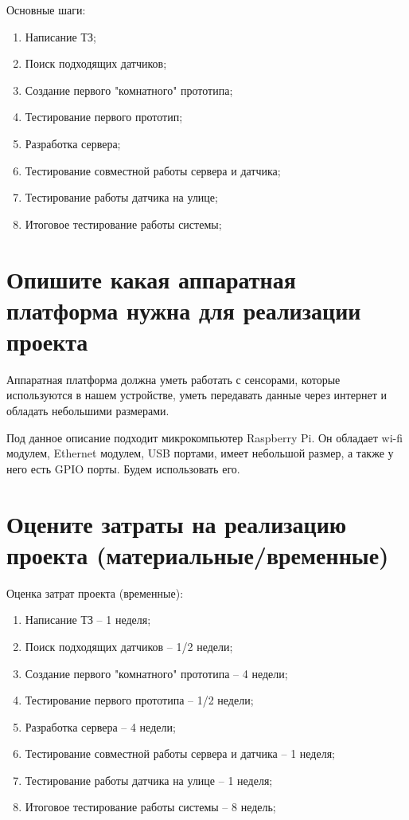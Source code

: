 \documentclass[a4paper,14pt]{article}
\begin{document}
Основные шаги:

\begin{enumerate}
	\item Написание ТЗ;
	\item Поиск подходящих датчиков;
	\item Создание первого "комнатного" прототипа;
	\item Тестирование первого прототип;
	\item Разработка сервера;
	\item Тестирование совместной работы сервера и датчика;
	\item Тестирование работы датчика на улице;
	\item Итоговое тестирование работы системы;
\end{enumerate}

\section{ Опишите какая аппаратная платформа нужна для реализации проекта}

Аппаратная платформа должна уметь работать с сенсорами, которые используются в нашем устройстве, уметь передавать данные через интернет и обладать небольшими размерами.

Под данное описание подходит микрокомпьютер Raspberry Pi. Он обладает wi-fi модулем, Ethernet модулем, USB портами, имеет небольшой размер, а также у него есть GPIO порты. Будем использовать его.

\section{ Оцените затраты на реализацию проекта (материальные/временные)}

Оценка затрат проекта (временные):

\begin{enumerate}
	\item Написание ТЗ -- 1 неделя; 
	\item Поиск подходящих датчиков -- 1/2 недели;
	\item Создание первого "комнатного" прототипа -- 4 недели;
	\item Тестирование первого прототипа -- 1/2 недели;
	\item Разработка сервера -- 4 недели;
	\item Тестирование совместной работы сервера и датчика -- 1 неделя;
	\item Тестирование работы датчика на улице -- 1 неделя;
	\item Итоговое тестирование работы системы -- 8 недель;
\end{enumerate}
\end{document}

